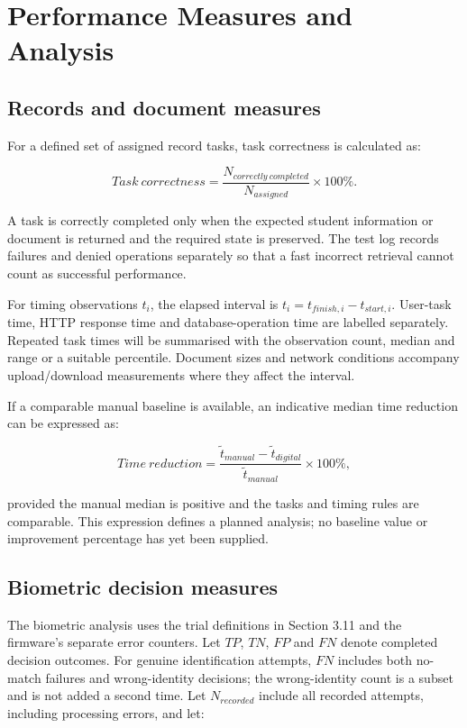 \section{Performance Measures and Analysis}\label{sec:3-13}

\subsection{Records and document measures}\label{sec:3-13-1}

For a defined set of assigned record tasks, task correctness is calculated as:

\begin{equation}
Task\ correctness=\frac{N_{correctly\ completed}}{N_{assigned}}\times100\%.
\end{equation}

A task is correctly completed only when the expected student information or document is returned and the required state is preserved. The test log records failures and denied operations separately so that a fast incorrect retrieval cannot count as successful performance.

For timing observations \(t_i\), the elapsed interval is \(t_i=t_{finish,i}-t_{start,i}\). User-task time, HTTP response time and database-operation time are labelled separately. Repeated task times will be summarised with the observation count, median and range or a suitable percentile. Document sizes and network conditions accompany upload/download measurements where they affect the interval.

If a comparable manual baseline is available, an indicative median time reduction can be expressed as:

\begin{equation}
Time\ reduction=\frac{\widetilde{t}_{manual}-\widetilde{t}_{digital}}
{\widetilde{t}_{manual}}\times100\%,
\end{equation}

provided the manual median is positive and the tasks and timing rules are comparable. This expression defines a planned analysis; no baseline value or improvement percentage has yet been supplied.

\subsection{Biometric decision measures}\label{sec:3-13-2}

The biometric analysis uses the trial definitions in Section 3.11 and the firmware's separate error counters. Let \(TP\), \(TN\), \(FP\) and \(FN\) denote completed decision outcomes. For genuine identification attempts, \(FN\) includes both no-match failures and wrong-identity decisions; the wrong-identity count is a subset and is not added a second time. Let \(N_{recorded}\) include all recorded attempts, including processing errors, and let:

